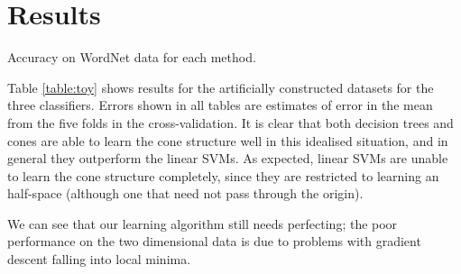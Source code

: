 \section{Results}


\begin{table*}
\begin{center}
\end{center}
\caption{Accuracy on WordNet data for each method.}
\label{table:toy}
\end{table*}



Table \ref{table:toy} shows results for the artificially constructed
datasets for the three classifiers. Errors shown in all tables are
estimates of error in the mean from the five folds in the
cross-validation. It is clear that both decision trees and cones are
able to learn the cone structure well in this idealised situation, and
in general they outperform the linear SVMs.  As expected, linear SVMs
are unable to learn the cone structure completely, since they are
restricted to learning an half-space (although one that need not pass
through the origin).

We can see that our learning algorithm still needs perfecting; the
poor performance on the two dimensional data is due to problems with
gradient descent falling into local minima.

